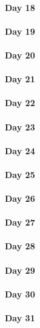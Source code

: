 \documentclass[UTF8,a4paper,8pt]{ctexart}
\begin{document}
 	 \paragraph{Day 18      \quad     }
 	 \paragraph{Day 19      \quad     }
 	 \paragraph{Day 20      \quad     }
 	 \paragraph{Day 21      \quad     }
 	 \paragraph{Day 22      \quad     }
 	 \paragraph{Day 23      \quad     }
 	 \paragraph{Day 24      \quad     }
 	 \paragraph{Day 25      \quad     }
 	 \paragraph{Day 26      \quad     }
 	 \paragraph{Day 27      \quad     }
 	 \paragraph{Day 28      \quad     }
 	 \paragraph{Day 29      \quad     }   
 	 \paragraph{Day 30      \quad     }
 	 \paragraph{Day 31      \quad     }
\end{document}
